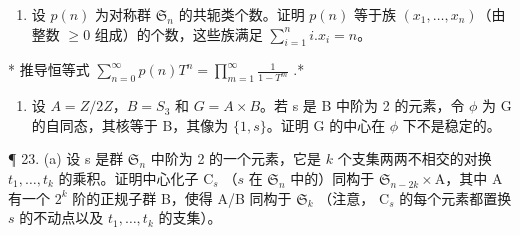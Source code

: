 \begin{enumerate}
\def\labelenumi{\arabic{enumi}。}
\setcounter{enumi}{20}
\tightlist
\item
  设 \(p(n)\) 为对称群 \(\mathfrak{S}_n\) 的共轭类个数。证明 \(p(n)\) 等于族 \((x_1, \ldots, x_n)\)（由整数 \(\geqslant 0\) 组成）的个数，这些族满足 \(\sum_{i=1}^{n} i.x_i = n\)。
\end{enumerate}

* 推导恒等式 \(\sum_{n=0}^{\infty} p(n) T^n = \prod_{m=1}^{\infty} \frac{1}{1 - T^m}\) .*

\begin{enumerate}
\def\labelenumi{\arabic{enumi}。}
\setcounter{enumi}{21}
\tightlist
\item
  设 \(A = Z/2Z\)，\(B = S_{3}\) 和 \(G = A \times B\)。若 s 是 B 中阶为 2 的元素，令 \(\phi\) 为 G 的自同态，其核等于 B，其像为 \(\{1, s\}\)。证明 G 的中心在 \(\phi\) 下不是稳定的。
\end{enumerate}

¶ 23. (a) 设 s 是群 \(\mathfrak{S}_n\) 中阶为 2 的一个元素，它是 \(k\) 个支集两两不相交的对换 \(t_1, \ldots, t_k\) 的乘积。证明中心化子 \(\mathrm{C}_s\) （\(s\) 在 \(\mathfrak{S}_n\) 中的）同构于 \(\mathfrak{S}_{n-2k} \times \mathrm{A}\)，其中 A 有一个 \(2^k\) 阶的正规子群 B，使得 A/B 同构于 \(\mathfrak{S}_k\) （注意， \(\mathrm{C}_s\) 的每个元素都置换 \(s\) 的不动点以及 \(t_1, \ldots, t_k\) 的支集）。

